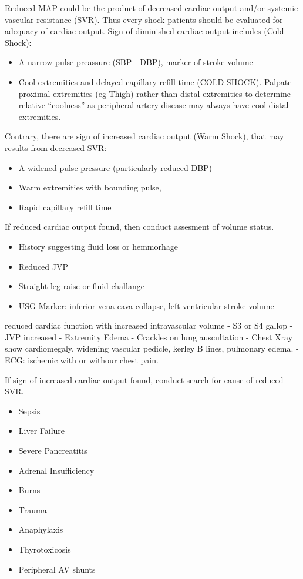 \documentclass[
  letterpaper,
  DIV=11,
  numbers=noendperiod]{scrreprt}
\providecommand{\tightlist}{%
  \setlength{\itemsep}{0pt}\setlength{\parskip}{0pt}}\usepackage{longtable,booktabs,array}
\begin{document}
Reduced MAP could be the product of decreased cardiac output and/or
systemic vascular resistance (SVR). Thus every shock patients should be
evaluated for adequacy of cardiac output. Sign of diminished cardiac
output includes (Cold Shock):

\begin{itemize}
\tightlist
\item
  A narrow pulse preassure (SBP - DBP), marker of stroke volume
\item
  Cool extremities and delayed capillary refill time (COLD SHOCK).
  Palpate proximal extremities (eg Thigh) rather than distal extremities
  to determine relative ``coolness'' as peripheral artery disease may
  always have cool distal extremities.
\end{itemize}

Contrary, there are sign of increased cardiac output (Warm Shock), that
may results from decreased SVR:

\begin{itemize}
\tightlist
\item
  A widened pulse pressure (particularly reduced DBP)
\item
  Warm extremities with bounding pulse,
\item
  Rapid capillary refill time
\end{itemize}

If reduced cardiac output found, then conduct assesment of volume
status.

\begin{itemize}
\tightlist
\item
  History suggesting fluid loss or hemmorhage
\item
  Reduced JVP
\item
  Straight leg raise or fluid challange
\item
  USG Marker: inferior vena cava collapse, left ventricular stroke
  volume
\end{itemize}

reduced cardiac function with increased intravascular volume - S3 or S4
gallop - JVP increased - Extremity Edema - Crackles on lung auscultation
- Chest Xray show cardiomegaly, widening vascular pedicle, kerley B
lines, pulmonary edema. - ECG: ischemic with or withour chest pain.

If sign of increased cardiac output found, conduct search for cause of
reduced SVR.

\begin{itemize}
\tightlist
\item
  Sepsis
\item
  Liver Failure
\item
  Severe Pancreatitis
\item
  Adrenal Insufficiency
\item
  Burns
\item
  Trauma
\item
  Anaphylaxis
\item
  Thyrotoxicosis
\item
  Peripheral AV shunts
\end{itemize}
\end{document}
